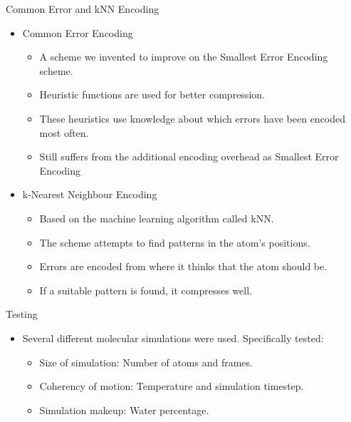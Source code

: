 \documentclass{beamer}
\begin{document}
\begin{frame}{Common Error and kNN Encoding}

\begin{itemize}
 \item Common Error Encoding
\begin{itemize}
 \item A scheme we invented to improve on the Smallest Error Encoding scheme.
 \item Heuristic functions are used for better compression.
 \item These heuristics use knowledge about which errors have been encoded most often.
 \item Still suffers from the additional encoding overhead as Smallest Error Encoding
\end{itemize}

\item k-Nearest Neighbour Encoding
\begin{itemize}
 \item Based on the machine learning algorithm called kNN.
 \item The scheme attempts to find patterns in the atom's positions.
 \item Errors are encoded from where it thinks that the atom should be.
 \item If a suitable pattern is found, it compresses well.
\end{itemize}
\end{itemize}
\end{frame}

\begin{frame}{Testing}
\begin{itemize}
 \item Several different molecular simulations were used. Specifically tested:
 \begin{itemize}
   \item Size of simulation: Number of atoms and frames.
   \item Coherency of motion: Temperature and simulation timestep.
   \item Simulation makeup: Water percentage.
 \end{itemize}
 \end{itemize}
\end{frame}
\end{document}
